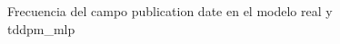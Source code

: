 \begin{figure}[H]
    \centering
    
    \caption{Frecuencia del campo publication date en el modelo real y tddpm\_mlp}
    \label{frecuency-Publication Date-tddpm_mlp}
\end{figure}